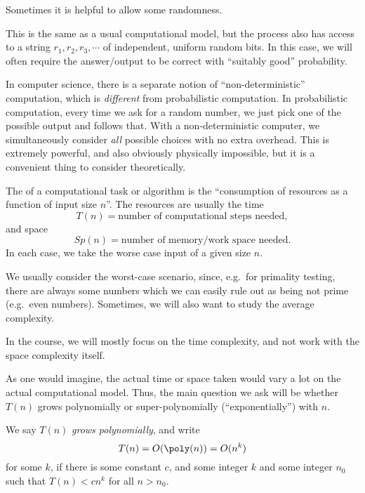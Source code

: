 \documentclass[a4paper]{article}
\begin{document}
Sometimes it is helpful to allow some randomness.
\begin{defi}
  This is the same as a usual computational model, but the process also has access to a string $r_1, r_2, r_3, \cdots$ of independent, uniform random bits. In this case, we will often require the answer/output to be correct with ``suitably good'' probability.
\end{defi}

In computer science, there is a separate notion of ``non-deterministic'' computation, which is \emph{different} from probabilistic computation. In probabilistic computation, every time we ask for a random number, we just pick one of the possible output and follows that. With a non-deterministic computer, we simultaneously consider \emph{all} possible choices with no extra overhead. This is extremely powerful, and also obviously physically impossible, but it is a convenient thing to consider theoretically.

\begin{defi}
  The  of a computational task or algorithm is the ``consumption of resources as a function of input size $n$''. The resources are usually the time
  \[
    T(n) = \text{number of computational steps needed},
  \]
  and space
  \[
    Sp(n) = \text{number of memory/work space needed}.
  \]
  In each case, we take the worse case input of a given size $n$.
\end{defi}
We usually consider the worst-case scenario, since, e.g.\ for primality testing, there are always some numbers which we can easily rule out as being not prime (e.g.\ even numbers). Sometimes, we will also want to study the average complexity.

In the course, we will mostly focus on the time complexity, and not work with the space complexity itself.

As one would imagine, the actual time or space taken would vary a lot on the actual computational model. Thus, the main question we ask will be whether $T(n)$ grows polynomially or super-polynomially (``exponentially'') with $n$.
\begin{defi}
  We say $T(n)$ \emph{grows polynomially}, and write
  \[
    T(n) = O(\poly(n)) = O(n^k)
  \]
  for some $k$, if there is some constant $c$, and some integer $k$ and some integer $n_0$ such that $T(n) < c n^k$ for all $n > n_0$.
\end{defi}
\end{document}
